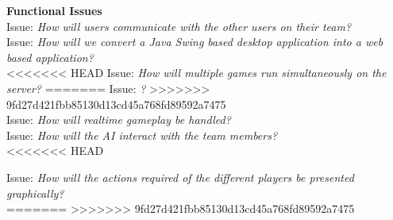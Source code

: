 \textbf{Functional Issues}
\\
Issue: \textit{How will users communicate with the other users on their team?}
\\

Issue: \textit{How will we convert a Java Swing based desktop application into a web based application?}
\\

<<<<<<< HEAD
Issue: \textit{How will multiple games run simultaneously on the server?}
=======
Issue: \textit{?}
>>>>>>> 9fd27d421fbb85130d13cd45a768fd89592a7475
\\

Issue: \textit{How will realtime gameplay be handled?}
\\

Issue: \textit{How will the AI interact with the team members?}
\\
<<<<<<< HEAD

Issue: \textit{How will the actions required of the different players be presented graphically?}
\\
=======
>>>>>>> 9fd27d421fbb85130d13cd45a768fd89592a7475
